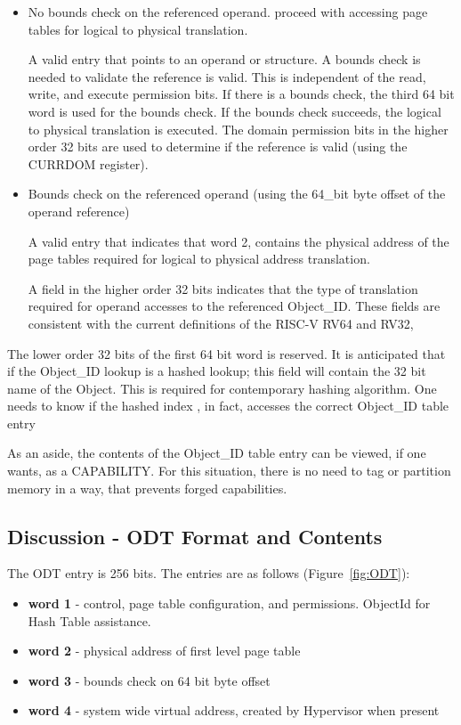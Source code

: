 \documentclass{article}
\begin{document}
\begin{itemize}
\item No bounds check on the referenced operand.  proceed with  accessing page tables for logical to physical translation.

A valid entry that points to an operand or structure.  A bounds check is needed to validate the reference is valid.  This is independent of the read, write, and execute permission bits. If there is a bounds check,  the third 64 bit word is used for the bounds check. If the bounds check succeeds,  the  logical to physical translation is executed. The domain permission bits in the higher order 32 bits are used to determine if the reference is valid (using the CURRDOM register).

\item Bounds check on the referenced operand (using the 64\_bit byte offset of the operand reference)

A   valid entry that  indicates that word 2, contains the physical address of the page tables required for logical  to physical address translation.

A field in the higher order 32 bits indicates that the type of   translation required for operand accesses to the referenced Object\_ID. These fields are  consistent with the current definitions of the RISC-V  RV64 and RV32,

\end{itemize}
The lower order 32 bits of the first 64 bit word is reserved.  It is anticipated that if the Object\_ID lookup is a hashed lookup;  this field will contain the 32 bit name of the Object.  This is required for contemporary  hashing algorithm.  One needs to know if the hashed  index , in fact, accesses the correct Object\_ID table entry

As an aside,  the contents of the Object\_ID table entry can be viewed, if one wants, as a CAPABILITY.  For this situation,  there is no need to tag or partition memory in a way, that prevents forged capabilities.

\subsection{Discussion - ODT Format and Contents}
\label{Discussion - ODT Format and Contents}

The ODT entry is 256 bits.  The entries are as follows (Figure~\ref{fig:ODT}):

\begin{itemize}

\item \textbf{word 1} - control, page table configuration, and permissions. ObjectId for Hash Table assistance. 
\item \textbf{word 2} - physical address of first level page table
\item \textbf{word 3} - bounds check on 64 bit byte offset
\item \textbf{word 4} - system wide virtual address, created by Hypervisor when present 
\end{itemize}
\end{document}
